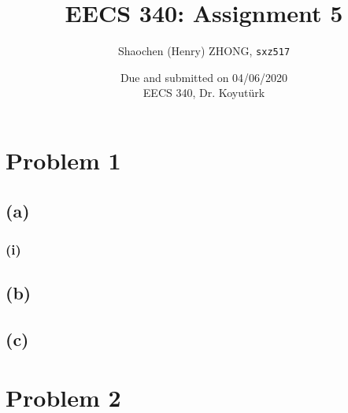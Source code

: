 \documentclass[11pt]{article}
\newcommand{\ilc}{\texttt}
\begin{document}
\title{\textbf{EECS 340: Assignment 5}}

\author{Shaochen (Henry) ZHONG, \ilc{sxz517}}
\date{Due and submitted on 04/06/2020 \\ EECS 340, Dr. Koyut{\"u}rk}
\maketitle

\section{Problem 1}

\subsection{(a)}

\subsubsection{(i)}



\subsection{(b)}


\subsection{(c)}


\section{Problem 2}

%
% 
% 
\end{document}
